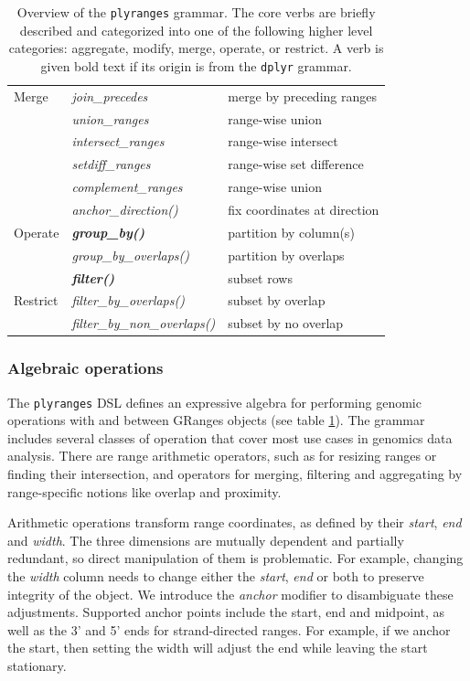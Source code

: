 \documentclass[]{article}
\begin{document}
\begin{table}[!htbp]
\begin{tabular}{|l|l|p{6cm}|}
    Merge & \emph{join\_precedes} & merge by preceding ranges \\
    & \emph{union\_ranges} & range-wise union \\
    & \emph{intersect\_ranges} & range-wise intersect \\
    & \emph{setdiff\_ranges} & range-wise set difference \\
    & \emph{complement\_ranges} & range-wise union \\
  \hline
   & \emph{anchor\_direction()} & fix coordinates at direction \\
  Operate & \textbf{\emph{group\_by()}} & partition by column(s)  \\ 
   & \emph{group\_by\_overlaps()} & partition by overlaps \\
   \hline
   & \textbf{\emph{filter()}} & subset rows \\
  Restrict & \emph{filter\_by\_overlaps()} & subset by overlap \\
    & \emph{filter\_by\_non\_overlaps()} & subset by no overlap \\
   \hline
\end{tabular}
\caption{Overview of the \texttt{plyranges} grammar. The core verbs are
briefly described and categorized into one of the following higher level 
categories: aggregate, modify, merge, operate, or restrict. A verb is given bold text if
its origin is from the \texttt{dplyr} grammar.}\label{tab:grammar}
\end{table}

\hypertarget{algebraic-operations}{%
\subsubsection{Algebraic operations}\label{algebraic-operations}}

The \texttt{plyranges} DSL defines an expressive algebra for performing
genomic operations with and between GRanges objects (see table
\ref{tab:grammar}). The grammar includes several classes of operation
that cover most use cases in genomics data analysis. There are range
arithmetic operators, such as for resizing ranges or finding their
intersection, and operators for merging, filtering and aggregating by
range-specific notions like overlap and proximity.

Arithmetic operations transform range coordinates, as defined by their
\emph{start}, \emph{end} and \emph{width}. The three dimensions are
mutually dependent and partially redundant, so direct manipulation of
them is problematic. For example, changing the \emph{width} column needs
to change either the \emph{start}, \emph{end} or both to preserve
integrity of the object. We introduce the \emph{anchor} modifier to
disambiguate these adjustments. Supported anchor points include the
start, end and midpoint, as well as the 3' and 5' ends for
strand-directed ranges. For example, if we anchor the start, then
setting the width will adjust the end while leaving the start
stationary.
\end{document}
